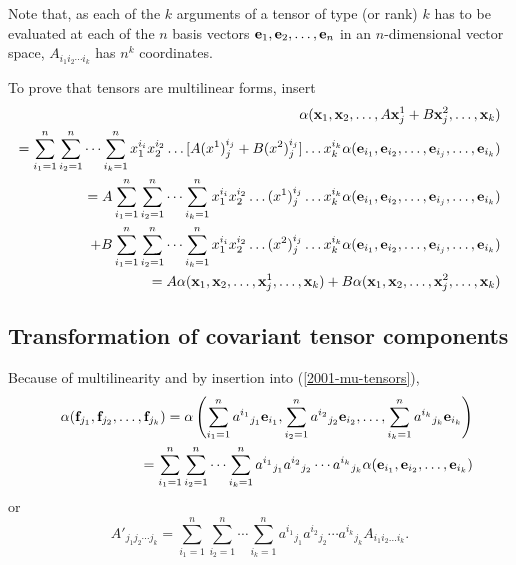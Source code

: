 Note that, as each of the $k$ arguments of  a tensor of type (or rank) $k$ has to be evaluated
at each of the $n$ basis vectors ${\bf e}_1,{\bf e}_2,\ldots ,{\bf e}_n$ in an $n$-dimensional vector space,
$A_{{i_1}{i_2}\cdots {i_k}} $ has $n^k$  coordinates.

{\color{OliveGreen}
\bproof
To prove that tensors are multilinear forms, insert
\begin{equation}
\begin{split}
 \alpha ( {\bf x}_1,{\bf x}_2,\ldots , A{\bf x}^1_j+B{\bf x}_j^2,\ldots ,{\bf x}_k)
\\
=
\sum_{i_1=1}^n
\sum_{i_2=1}^n
\cdots
\sum_{i_k=1}^n
x^{i_i}_1x^{i_2}_2\ldots  [A(x^1)^{i_j}_j+B(x^2)^{i_j}_j]\ldots x^{i_k}_k
\alpha ( {\bf e}_{i_1},{\bf e}_{i_2},\ldots,{\bf e}_{i_j},\ldots ,{\bf e}_{i_k})
\\
= A
\sum_{i_1=1}^n
\sum_{i_2=1}^n
\cdots
\sum_{i_k=1}^n
x^{i_i}_1x^{i_2}_2\ldots  (x^1)^{i_j}_j\ldots x^{i_k}_k
\alpha ( {\bf e}_{i_1},{\bf e}_{i_2},\ldots,{\bf e}_{i_j},\ldots ,{\bf e}_{i_k})
\\
\quad +
B
\sum_{i_1=1}^n
\sum_{i_2=1}^n
\cdots
\sum_{i_k=1}^n
x^{i_i}_1x^{i_2}_2\ldots  (x^2)^{i_j}_j\ldots x^{i_k}_k
\alpha ( {\bf e}_{i_1},{\bf e}_{i_2},\ldots,{\bf e}_{i_j},\ldots ,{\bf e}_{i_k})
\\
=
A \alpha ( {\bf x}_1,{\bf x}_2,\ldots , {\bf x}^1_j,\ldots ,{\bf x}_k)+
B \alpha ( {\bf x}_1,{\bf x}_2,\ldots , {\bf x}_j^2,\ldots ,{\bf x}_k)\nonumber
\end{split}
\end{equation}
\eproof
}

\subsection{Transformation of covariant tensor components}

Because of multilinearity  and by insertion into
(\ref{2001-mu-tensors}),
\begin{eqnarray}
&&\alpha ( {\bf f}_{j_1},{\bf f}_{j_2},\ldots ,{\bf f}_{j_k})=
\alpha \left(
\sum_{i_1=1}^n {a^{i_1}}_{j_1} {\bf e}_{i_1},
\sum_{i_2=1}^n {a^{i_2}}_{j_2} {\bf e}_{i_2},
\ldots ,
\sum_{i_k=1}^n {a^{i_k}}_{j_k} {\bf e}_{i_k}
\right)
\nonumber \\&& \quad
=
\sum_{i_1=1}^n\sum_{i_2=1}^n\cdots \sum_{i_k=1}^n
{a^{i_1}}_{j_1}{a^{i_2}}_{j_2}\cdots {a^{i_k}}_{j_k} \alpha ( {\bf e}_{i_1},{\bf e}_{i_2},\ldots ,{\bf e}_{i_k})
\label{2012-m-ch-tensor-etotc1}
\end{eqnarray}
or
\begin{equation}
A'_{{j_1}{j_2}\cdots {j_k}}=
\sum_{i_1=1}^n\sum_{i_2=1}^n\cdots \sum_{i_k=1}^n
{a^{i_1}}_{j_1}{a^{i_2}}_{j_2}\cdots {a^{i_k}}_{j_k} A_{i_1 i_2\ldots i_k}.
\label{2011-m-tvtcov}
\end{equation}

